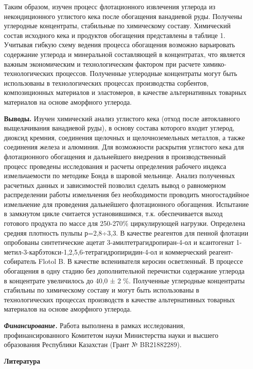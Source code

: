 Таким образом, изучен процесс флотационного извлечения углерода из
некондиционного углистого кека после обогащения ванадиевой руды.
Получены углеродные концентраты, стабильные по химическому составу.
Химический состав исходного кека и продуктов обогащения представлены в
таблице 1. Учитывая гибкую схему ведения процесса обогащения возможно
варьировать содержание углерода и минеральной составляющей в
концентратах, что является важным экономическим и технологическим
фактором при расчете химико-технологических процессов. Полученные
углеродные концентраты могут быть использованы в технологических
процессах производства сорбентов, композиционных материалов и
эластомеров, в качестве альтернативных товарных материалов на основе
аморфного углерода.

{\bfseries Выводы.} Изучен химический анализ углистого кека (отход после
автоклавного выщелачивания ванадиевой руды), в основу состава которого
входит углерод, диоксид кремния, соединения щелочных и щелочноземельных
металлов, а также соединения железа и алюминия. Для возможности
раскрытия углистого кека для флотационного обогащения и дальнейшего
внедрения в производственный процесс проведены исследования и расчеты
определения рабочего индекса измельчаемости по методике Бонда в шаровой
мельнице. Анализ полученных расчетных данных и зависимостей позволил
сделать вывод о равномерном распределении работы измельчения без
необходимости проводить многостадийное измельчение для проведения
дальнейшего флотационного обогащения. Испытание в замкнутом цикле
считается установившимся, т.к. обеспечивается выход готового продукта по
массе для 250-270\% циркулирующей нагрузки. Определена средняя плотность
пульпы р=2,8÷3,3. В качестве реагентов для пенной флотации опробованы
синтетические ацетат 3-амилтетрагидропиран-4-ол и ксантогенат
1-метил-3-карбэтокси-1,2,5,6-тетрагидропиридин-4-ол и коммерческий
реагент-собиратель Flotol B. В качестве вспенивателя керосин
осветленный. В процессе обогащения в одну стадию без дополнительной
перечистки содержание углерода в концентрате увеличилось до 40,0 ± 2 \%.
Полученные углеродные концентраты стабильны по химическому составу и
могут быть использованы в технологических процессах производств в
качестве альтернативных товарных материалов на основе аморфного
углерода.

\emph{{\bfseries Финансирование.}} Работа выполнена в рамках исследования,
профинансированного Комитетом науки Министерства науки и высшего
образования Республики Казахстан (Грант № BR21882289).

{\bfseries Литература}

